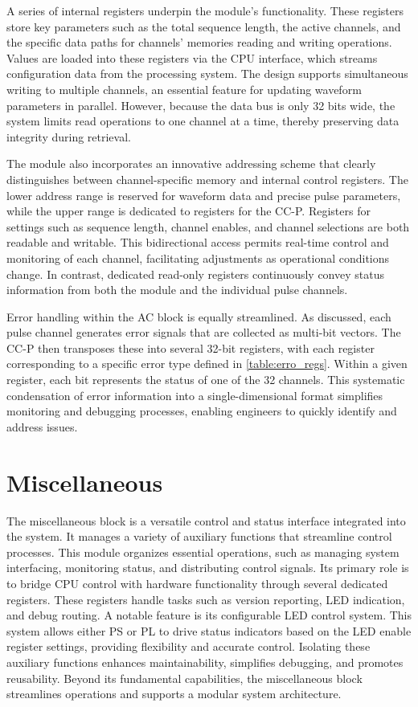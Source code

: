 A series of internal registers underpin the module's functionality. These registers store key parameters such as the total sequence length, the active channels, and the specific data paths for channels' memories reading and writing operations. Values are loaded into these registers via the CPU interface, which streams configuration data from the processing system. The design supports simultaneous writing to multiple channels, an essential feature for updating waveform parameters in parallel. However, because the data bus is only 32 bits wide, the system limits read operations to one channel at a time, thereby preserving data integrity during retrieval.

The module also incorporates an innovative addressing scheme that clearly distinguishes between channel-specific memory and internal control registers. The lower address range is reserved for waveform data and precise pulse parameters, while the upper range is dedicated to registers for the CC-P. Registers for settings such as sequence length, channel enables, and channel selections are both readable and writable. This bidirectional access permits real-time control and monitoring of each channel, facilitating adjustments as operational conditions change. In contrast, dedicated read-only registers continuously convey status information from both the module and the individual pulse channels.

Error handling within the AC block is equally streamlined. As discussed, each pulse channel generates error signals that are collected as multi-bit vectors. The CC-P then transposes these into several 32-bit registers, with each register corresponding to a specific error type defined in \autoref{table:erro_regs}. Within a given register, each bit represents the status of one of the 32 channels. This systematic condensation of error information into a single-dimensional format simplifies monitoring and debugging processes, enabling engineers to quickly identify and address issues.

\section{Miscellaneous}

The miscellaneous block is a versatile control and status interface integrated into the system. It manages a variety of auxiliary functions that streamline control processes. This module organizes essential operations, such as managing system interfacing, monitoring status, and distributing control signals. Its primary role is to bridge CPU control with hardware functionality through several dedicated registers. These registers handle tasks such as version reporting, LED indication, and debug routing. A notable feature is its configurable LED control system. This system allows either PS or PL to drive status indicators based on the LED enable register settings, providing flexibility and accurate control. Isolating these auxiliary functions enhances maintainability, simplifies debugging, and promotes reusability. Beyond its fundamental capabilities, the miscellaneous block streamlines operations and supports a modular system architecture.

